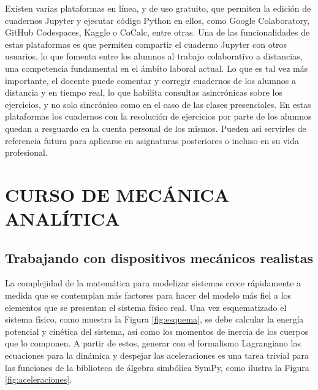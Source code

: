 \documentclass[a4paper]{fodami}        %
\begin{document}
Existen varias plataformas en línea, y de uso gratuito, que permiten la edición de cuadernos Jupyter y ejecutar código Python en ellos, como Google Colaboratory, GitHub Codespaces, Kaggle o CoCalc, entre otras.
Una de las funcionalidades de estas plataformas es que permiten compartir el cuaderno Jupyter con otros usuarios, lo que fomenta entre los alumnos al trabajo colaborativo a distancias, una competencia fundamental en el ámbito laboral actual.
Lo que es tal vez más importante, el docente puede comentar y corregir cuadernos de los alumnos a distancia y en tiempo real, lo que habilita consultas asincrónicas sobre los ejercicios, y no solo sincrónico como en el caso de las clases presenciales.
En estas plataformas los cuadernos con la resolución de ejercicios por parte de los alumnos quedan a resguardo en la cuenta personal de los mismos.
Pueden así servirles de referencia futura para aplicarse en asignaturas posteriores o incluso en su vida profesional.


\section{CURSO DE MECÁNICA ANALÍTICA}

\subsection{Trabajando con dispositivos mecánicos realistas}

La complejidad de la matemática para modelizar sistemas crece rápidamente a medida que se contemplan más factores para hacer del modelo más fiel a los elementos que se presentan el sistema físico real.
Una vez esquematizado el sistema físico, como muestra la Figura \ref{fig:esquema}, se debe calcular la energía potencial y cinética del sistema, así como los momentos de inercia de los cuerpos que lo componen. 
A partir de estos, generar con el formalismo Lagrangiano las ecuaciones para la dinámica y despejar las aceleraciones es una tarea trivial para las funciones de la biblioteca de álgebra simbólica SymPy, como ilustra la Figura \ref{fig:aceleraciones}.
\end{document}
